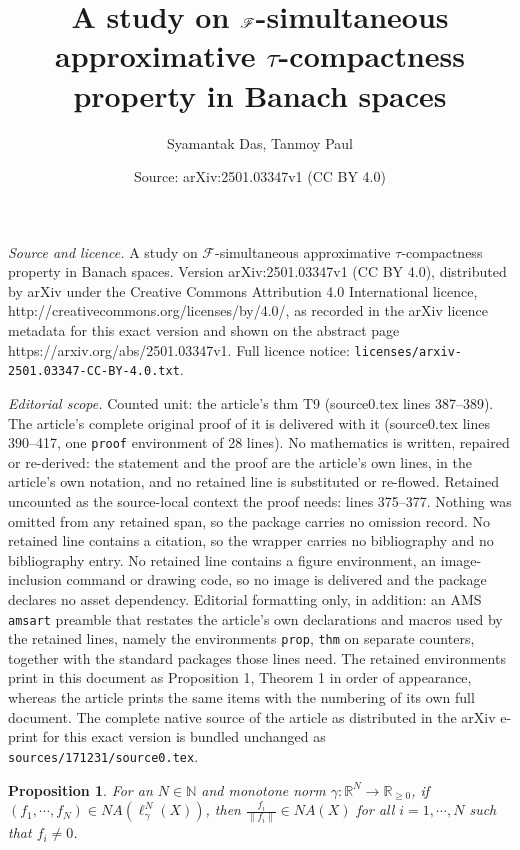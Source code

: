 \documentclass[10pt,a4paper]{amsart}
\title{A study on $\mr{F}$-simultaneous approximative $\tau$-compactness property in Banach spaces}
\author{Syamantak Das, Tanmoy Paul}
\date{Source: arXiv:2501.03347v1 (CC BY 4.0)}
\newcommand{\mr}{\mathscr}
\newtheorem{prop}{Proposition}
\newcommand{\ga}{\gamma}
\newcommand{\mb}{\mathbb}
\newcommand{\ra}{\rightarrow}
\begin{document}
\maketitle

\noindent\emph{Source and licence.} A study on $\mr{F}$-simultaneous approximative $\tau$-compactness property in Banach spaces. Version arXiv:2501.03347v1 (CC BY 4.0), distributed by arXiv under the Creative Commons Attribution 4.0 International licence, http://creativecommons.org/licenses/by/4.0/, as recorded in the arXiv licence metadata for this exact version and shown on the abstract page https://arxiv.org/abs/2501.03347v1. Full licence notice: \texttt{licenses/arxiv-2501.03347-CC-BY-4.0.txt}.\par\smallskip

\noindent\textit{Editorial scope.} Counted unit: the article's thm T9 (source0.tex lines 387--389). The article's complete original proof of it is delivered with it (source0.tex lines 390--417, one \texttt{proof} environment of 28 lines). No mathematics is written, repaired or re-derived: the statement and the proof are the article's own lines, in the article's own notation, and no retained line is substituted or re-flowed.  Retained uncounted as the source-local context the proof needs: lines 375--377.  Nothing was omitted from any retained span, so the package carries no omission record.  No retained line contains a citation, so the wrapper carries no bibliography and no bibliography entry.  No retained line contains a figure environment, an image-inclusion command or drawing code, so no image is delivered and the package declares no asset dependency.  Editorial formatting only, in addition: an AMS \texttt{amsart} preamble that restates the article's own declarations and macros used by the retained lines, namely the environments \texttt{prop}, \texttt{thm} on separate counters, together with the standard packages those lines need.  The retained environments print in this document as Proposition 1, Theorem 1 in order of appearance, whereas the article prints the same items with the numbering of its own full document.  The complete native source of the article as distributed in the arXiv e-print for this exact version is bundled unchanged as \texttt{sources/171231/source0.tex}.
\begin{prop}\label{P5}
For an $N\in\mb{N}$ and monotone norm $\ga:\mb{R}^N\ra\mb{R}_{\geq0}$, if $(f_1,\cdots,f_N)\in NA(\ell_\ga^N(X))$, then $\frac{f_i}{\|f_i\|}\in NA(X)$ for all $i=1,\cdots,N$ such that $f_i\neq0$.
\end{prop}
\end{document}
